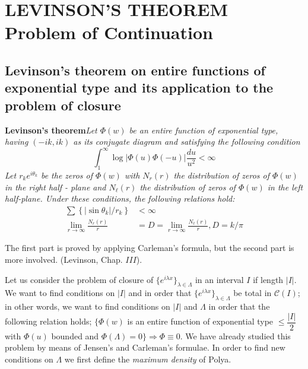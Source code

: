 \chapter{LEVINSON'S THEOREM Problem of Continuation}\label{chap12}%

\section[Levinson's theorem on entire functions...]{Levinson's theorem on entire functions of exponential type
 and its application to the problem of closure}\label{chap12:sec1}%

\noindent
\textbf{Levinson's theorem}\pageoriginale \textit{Let $ \Phi (w)$ be an entire
 function of exponential type, having $(-ik, ik)$ as its conjugate
 diagram and satisfying the following condition} 
\begin{equation}
 \int^\infty_1 \log | \Phi (u)\Phi (-u) | \frac{du}{u^2} < \infty \tag{a}
\end{equation}
\textit{Let $r_k e^{i \theta_ k}$ be the zeros of $\Phi (w)$ with
 $N_r(r)$ the distribution of zeros of $\Phi(w)$ in the right half -
 plane and $N_\ell (r)$ the distribution of zeros of $\Phi(w)$ in the
 left half-plane. Under these conditions, the following relations
 hold:} 
\begin{align*}
 \sum \left\{ | \sin \theta_k| / r_k \right\} & < \infty
 \tag{1}\label{chap12:sec1:eq1} \\
 \lim_{r \rightarrow \infty } \frac{N_r(r)}{r} &= D = \lim_{r
 \rightarrow \infty} \frac{N_\ell (r)}{r}, D = k/\pi
 \tag{2}\label{chap12:sec1:eq2}  
\end{align*}

The first part is proved by applying Carleman's formula, but the
second part is more involved. (Levinson, Chap. $III$). 

Let us consider the problem of closure of $\{e^{i \lambda x}
\}_{\lambda \in \Lambda}$ in an interval $I$ if length $|I|$. We want
to find conditions on $|I|$ and in order that $\{e^{i \lambda x}
\}_{\lambda \in \Lambda}$ be total in $\mathscr{C}(I)$; in other
words, we want to find conditions on $|I|$ and $\Lambda$ in order that
the following relation holds; $\{ \Phi (w)$ is an entire function of
exponential type $\le \dfrac{|I|}{2}$ with $\Phi(u)$ bounded and $\Phi
(\Lambda) = 0 \} \Rightarrow \Phi \equiv 0$. We have already studied this
problem by means of Jensen's and Carleman's formulae. In order to find
new conditions on $\Lambda$ we first define the \textit{ maximum
 density } of Polya. 

